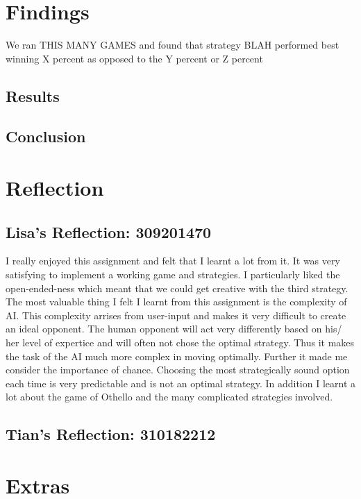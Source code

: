 \documentclass[12pt]{article}
\begin{document}
\section{Findings}
We ran THIS MANY GAMES and found that strategy BLAH performed best winning X percent as opposed to the Y percent or Z percent
\subsection{Results}

\subsection{Conclusion}

\section{Reflection}

\subsection{Lisa's Reflection: 309201470}

I really enjoyed this assignment and felt that I learnt a lot from it. It was very satisfying to implement a working game and strategies. I particularly liked the open-ended-ness which meant that we could get creative with the third strategy. The most valuable thing I felt I learnt from this assignment is the complexity of AI. This complexity arrises from user-input and makes it very difficult to create an ideal opponent. The human opponent will act very differently based on his/ her level of expertice and will often not chose the optimal strategy. Thus it makes the task of the AI much more complex in moving optimally. Further it made me consider the importance of chance. Choosing the most strategically sound option each time is very predictable and is not an optimal strategy. In addition I learnt a lot about the game of Othello and the many complicated strategies involved.

\subsection{Tian's Reflection: 310182212}

\section{Extras}
\end{document}
